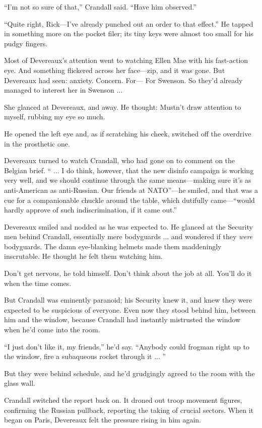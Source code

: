 ``I'm not so sure of that,'' Crandall said. ``Have him observed.''

``Quite right, Rick---I've already punched out an order to that effect.'' He tapped in something more on the pocket filer; its tiny keys were almost too small for his pudgy fingers.

Most of Devereaux's attention went to watching Ellen Mae with his fast-action eye. And something flickered across her face---zip, and it was gone. But Devereaux had seen: anxiety. Concern. For--- For Swenson. So they'd already managed to interest her in Swenson ...

She glanced at Devereaux, and away. He thought: Mustn't draw attention to myself, rubbing my eye so much.

He opened the left eye and, as if scratching his cheek, switched off the overdrive in the prosthetic one.

Devereaux turned to watch Crandall, who had gone on to comment on the Belgian brief. `` ... I do think, however, that the new disinfo campaign is working very well, and we should continue through the same means---making sure it's as anti-American as anti-Russian. Our friends at NATO''---he smiled, and that was a cue for a companionable chuckle around the table, which dutifully came---``would hardly approve of such indiscrimination, if it came out.''

Devereaux smiled and nodded as he was expected to. He glanced at the Security men behind Crandall, essentially mere bodyguards ... and wondered if they \textit{were} bodyguards. The damn eye-blanking helmets made them maddeningly inscrutable. He thought he felt them watching him.

Don't get nervous, he told himself. Don't think about the job at all. You'll do it when the time comes.

But Crandall was eminently paranoid; his Security knew it, and knew they were expected to be suspicious of everyone. Even now they stood behind him, between him and the window, because Crandall had instantly mistrusted the window when he'd come into the room.

``I just don't like it, my friends,'' he'd say. ``Anybody could frogman right up to the window, fire a subaqueous rocket through it ... ''

But they were behind schedule, and he'd grudgingly agreed to the room with the glass wall.

Crandall switched the report back on. It droned out troop movement figures, confirming the Russian pullback, reporting the taking of crucial sectors. When it began on Paris, Devereaux felt the pressure rising in him again.

